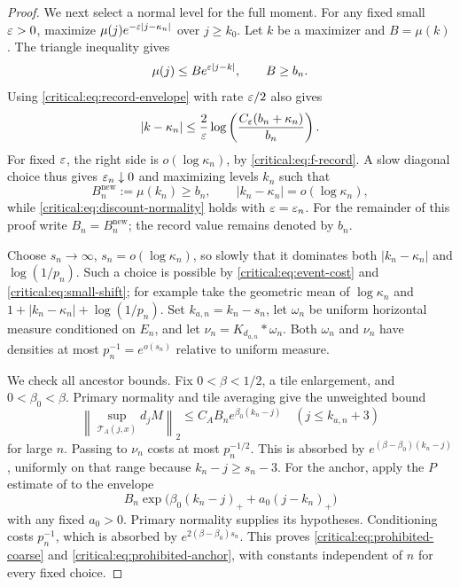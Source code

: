 \begin{proof}
We next select a normal level for the full moment. For any fixed
small \(\varepsilon>0\), maximize
\(\mu(j)e^{-\varepsilon|j-\kappa_n|}\) over \(j\ge k_0\).
Let \(k\) be a maximizer and \(B=\mu(k)\). The triangle
inequality gives
\begin{equation}\label{critical:eq:discount-normality}
 \mu(j)\le B e^{\varepsilon|j-k|},\qquad B\ge b_n.
\end{equation}
Using \eqref{critical:eq:record-envelope} with rate \(\varepsilon/2\)
also gives
\[
 |k-\kappa_n|\le\frac2{\varepsilon}
         \log\left(\frac{C_\varepsilon(b_n+\kappa_n)}{b_n}\right).
\]
For fixed \(\varepsilon\), the right side is \(o(\log\kappa_n)\),
by \eqref{critical:eq:f-record}. A slow diagonal choice thus gives
\(\varepsilon_n\downarrow0\) and maximizing levels \(k_n\) such that
\begin{equation}\label{critical:eq:small-shift}
 B_n^{\mathrm{new}}:=\mu(k_n)\ge b_n,
 \qquad |k_n-\kappa_n|=o(\log\kappa_n),
\end{equation}
while \eqref{critical:eq:discount-normality} holds with
\(\varepsilon=\varepsilon_n\). For the remainder of this proof write
\(B_n=B_n^{\mathrm{new}}\); the record value remains denoted by
\(b_n\).

Choose \(s_n\to\infty\), \(s_n=o(\log\kappa_n)\), so slowly
that it dominates both \(|k_n-\kappa_n|\) and \(\log(1/p_n)\).
Such a choice is possible by \eqref{critical:eq:event-cost} and
\eqref{critical:eq:small-shift}; for example take the geometric mean
of \(\log\kappa_n\) and
\(1+|k_n-\kappa_n|+\log(1/p_n)\).
Set \(k_{a,n}=k_n-s_n\), let \(\omega_n\) be uniform horizontal
measure conditioned on \(E_n\), and let
\(\nu_n=K_{d_{a,n}}*\omega_n\). Both \(\omega_n\) and
\(\nu_n\) have densities at most \(p_n^{-1}=e^{o(s_n)}\)
relative to uniform measure.

We check all ancestor bounds. Fix \(0<\beta<1/2\), a tile
enlargement, and \(0<\beta_0<\beta\). Primary normality and
tile averaging give the unweighted bound
\[
 \left\|\sup_{\mathcal T_A(j,x)}d_jM\right\|_2
 \le C_A B_n e^{\beta_0(k_n-j)}
 \quad(j\le k_{a,n}+3)
\]
for large \(n\). Passing to \(\nu_n\) costs at most
\(p_n^{-1/2}\). This is absorbed by
\(e^{(\beta-\beta_0)(k_n-j)}\), uniformly on that range because
\(k_n-j\ge s_n-3\). For the anchor, apply the \(P\) estimate
of  to the envelope
\[
 B_n\exp\bigl(\beta_0(k_n-j)_++a_0(j-k_n)_+\bigr)
\]
with any fixed \(a_0>0\). Primary normality supplies its hypotheses.
Conditioning costs \(p_n^{-1}\), which is absorbed by
\(e^{2(\beta-\beta_0)s_n}\). This proves
\eqref{critical:eq:prohibited-coarse} and
\eqref{critical:eq:prohibited-anchor}, with constants independent of
\(n\) for every fixed choice.


\end{proof}
